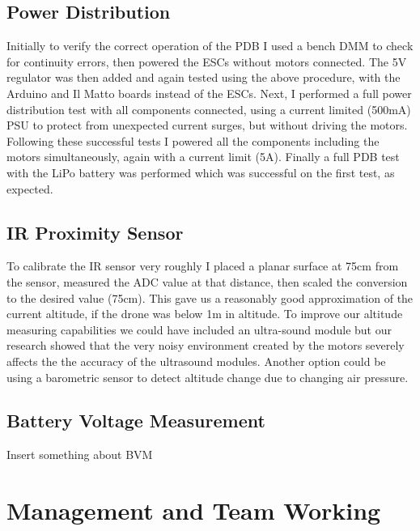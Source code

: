 \documentclass[a4paper,11pt]{article}
\begin{document}
\subsection{Power Distribution}
 Initially to verify the correct operation of the PDB I used a bench DMM to check for continuity errors, then powered the ESCs without motors connected. The 5V regulator was then added and again tested using the above procedure, with the Arduino and Il Matto boards instead of the ESCs. Next, I performed a full power distribution test with all components connected, using a current limited (500mA) PSU to protect from unexpected current surges, but without driving the motors. Following these successful tests I powered all the components including the motors simultaneously, again with a current limit (5A). Finally a full PDB test with the LiPo battery was performed which was successful on the first test, as expected.
\subsection{IR Proximity Sensor}
To calibrate the IR sensor very roughly I placed a planar surface at 75cm from the sensor, measured the ADC value at that distance, then scaled the conversion to the desired value (75cm). This gave us a reasonably good approximation of the current altitude, if the drone was below 1m in altitude. To improve our altitude measuring capabilities we could have included an ultra-sound module but our research showed that the very noisy environment created by the motors severely affects the the accuracy of the ultrasound modules. Another option could be using a barometric sensor to detect altitude change due to changing air pressure. 

\subsection{Battery Voltage Measurement}
Insert something about BVM

\section{Management and Team Working}
\end{document}
